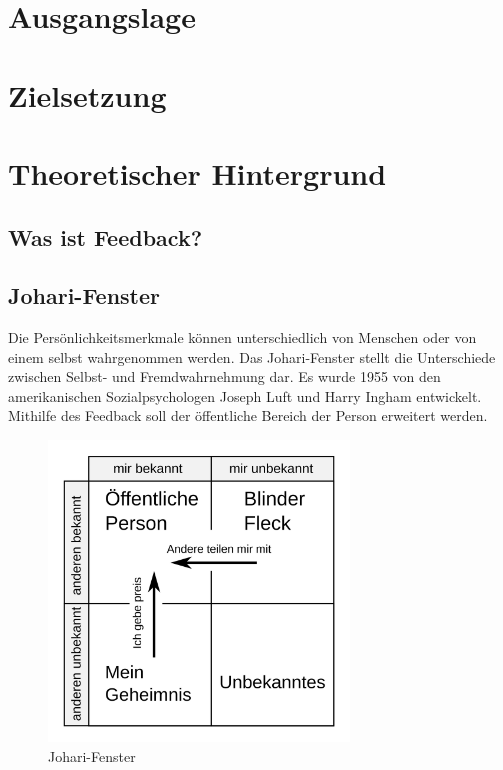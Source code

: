 \section{Ausgangslage}


\section{Zielsetzung}


\section{Theoretischer Hintergrund}

\subsection{Was ist Feedback?}



\subsection{Johari-Fenster}
Die Persönlichkeitsmerkmale können unterschiedlich von Menschen oder von einem selbst wahrgenommen werden.
Das Johari-Fenster stellt die Unterschiede zwischen Selbst- und Fremdwahrnehmung dar. 
Es wurde 1955 von den amerikanischen Sozialpsychologen Joseph Luft und Harry Ingham entwickelt. Mithilfe des 
Feedback soll der öffentliche Bereich der Person erweitert werden.

\begin{figure}[h]
    \begin{center}
        \includegraphics*[width=8cm]{./pics/Johari.png}
        \caption[Johari-Fenster]{Johari-Fenster \cite{Johari}}
    \end{center}
\end{figure}

